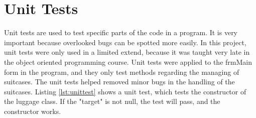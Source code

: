 

\section{Unit Tests}
\label{sec:unittests}
Unit tests are used to test specific parts of the code in a program. It is very important because overlooked bugs can be spotted more easily. In this project, unit tests were only used in a limited extend, because it was taught very late in the object oriented programming course. Unit tests were applied to the frmMain form in the program, and they only test methods regarding the managing of suitcases. The unit tests helped removed minor bugs in the handling of the suitcases.
Listing \ref{lst:unittest} shows a unit test, which tests the constructor of the luggage class. If the "target" is not null, the test will pass, and the constructor works. 
